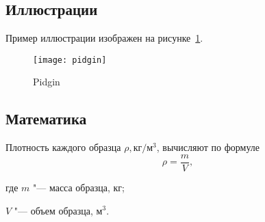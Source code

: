 \subsection{Иллюстрации}

Пример иллюстрации изображен на рисунке~\ref{pidgin}.

\begin{figure}[ht]
  \center
  \texttt{[image: pidgin]}
  \caption{Pidgin}\label{pidgin}
\end{figure}

\subsection{Математика}

Плотность каждого образца $\rho, \text{кг}/\text{м}^3$, вычисляют
по формуле
\begin{equation}
\label{eq:1}
\rho = \frac{m}{V},
\end{equation}
\begin{ESKDexplanation}
\item[где ] $m$ "--- масса образца, кг;
\item $V$ "--- объем образца, $\text{м}^3$.
\end{ESKDexplanation}
